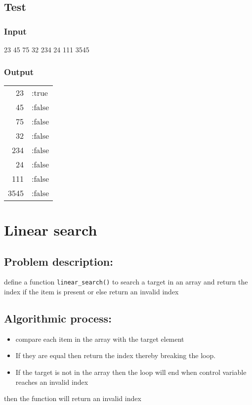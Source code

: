 \documentclass[11pt]{article}
\begin{document}
\subsection*{Test}
\label{sec-5-5}
\subsubsection*{Input}
\label{sec-5-5-1}
23 45 75 32 234 24 111 3545 
\subsubsection*{Output}
\label{sec-5-5-2}
\begin{center}
\begin{tabular}{rl}
23 & :true\\
45 & :false\\
75 & :false\\
32 & :false\\
234 & :false\\
24 & :false\\
111 & :false\\
3545 & :false\\
\end{tabular}
\end{center}

\section{Linear search}
\label{sec-6}

\subsection*{Problem description:}
\label{sec-6-1}
define a function \texttt{linear\_search()} to search a target in an array and return the index if the item is present 
or else return an invalid index

\subsection*{Algorithmic process:}
\label{sec-6-2}
\begin{itemize}
\item compare each item in the array with the target element
\item If they are equal then return the index thereby breaking the loop.
\item If the target is not in the array then the loop will end when control variable reaches an invalid index
\end{itemize}
then the function will return an invalid index
\end{document}
